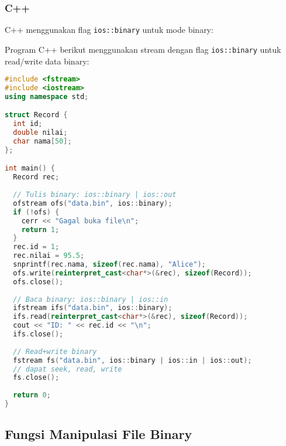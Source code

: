 \documentclass[../main.tex]{subfiles}
\begin{document}
\subsubsection{C++}
C++ menggunakan flag \texttt{ios::binary} untuk mode binary:

Program C++ berikut menggunakan stream dengan flag \texttt{ios::binary} untuk read/write data binary:

\begin{lstlisting}[language=C++, caption={Mode file binary di C++}]
#include <fstream>
#include <iostream>
using namespace std;

struct Record {
  int id;
  double nilai;
  char nama[50];
};

int main() {
  Record rec;
  
  // Tulis binary: ios::binary | ios::out
  ofstream ofs("data.bin", ios::binary);
  if (!ofs) {
    cerr << "Gagal buka file\n";
    return 1;
  }
  rec.id = 1;
  rec.nilai = 95.5;
  snprintf(rec.nama, sizeof(rec.nama), "Alice");
  ofs.write(reinterpret_cast<char*>(&rec), sizeof(Record));
  ofs.close();
  
  // Baca binary: ios::binary | ios::in
  ifstream ifs("data.bin", ios::binary);
  ifs.read(reinterpret_cast<char*>(&rec), sizeof(Record));
  cout << "ID: " << rec.id << "\n";
  ifs.close();
  
  // Read+write binary
  fstream fs("data.bin", ios::binary | ios::in | ios::out);
  // dapat seek, read, write
  fs.close();
  
  return 0;
}
\end{lstlisting}

\subsection{Fungsi Manipulasi File Binary}
\end{document}
